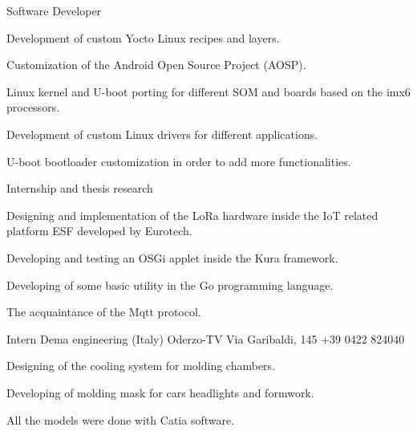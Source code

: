 \documentclass[english,a4paper]{europasscv}
\begin{document}
\begin{europasscv}
		 {
			Software Developer
		}
		\ecvitem{} {
			\begin{ecvitemize}
				\item Development of custom Yocto Linux recipes and layers.
				\item Customization of the Android Open Source Project (AOSP).
				\item Linux kernel and U-boot porting for different SOM and
					boards based on the imx6 processors.
				\item Development of custom Linux drivers for different
					applications.
				\item U-boot bootloader customization in order to add
					more functionalities.
			\end{ecvitemize}
		}

		 {
			Internship and thesis research
		}
		\ecvitem{} {
			\begin{ecvitemize}
					\item Designing and implementation of the LoRa hardware
						inside the IoT related platform ESF developed by
						Eurotech.
					\item Developing and testing an OSGi applet inside the Kura
						framework.
					\item Developing of some basic utility in the Go programming
						language.
					\item The acquaintance of the Mqtt protocol.
			\end{ecvitemize}
		}

		 {
			Intern
		}
		\ecvitem{} {
			Dema engineering (Italy) Oderzo-TV Via Garibaldi,
			145 \newline +39 0422 824040
			\newline {}
		}
		\ecvitem{} {
			\begin{ecvitemize}
				\item Designing of the cooling system for molding chambers.
				\item Developing of molding mask for cars headlights
					and formwork.
				\item All the models were done with Catia software.
			\end{ecvitemize}
		}


\end{europasscv}
\end{document}
